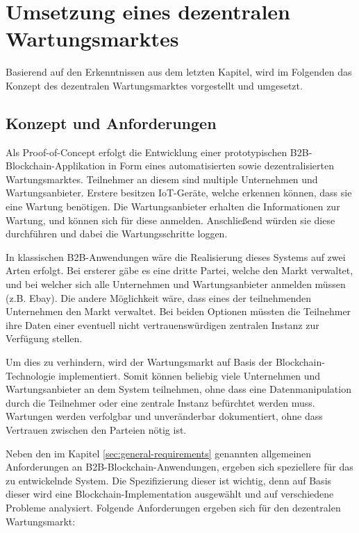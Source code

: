\chapter{Umsetzung eines dezentralen Wartungsmarktes}
\label{cha:wartungsmarkt-impl}

Basierend auf den Erkenntnissen aus dem letzten Kapitel, wird im Folgenden das Konzept des dezentralen Wartungsmarktes vorgestellt und umgesetzt.

\section{Konzept und Anforderungen}
Als Proof-of-Concept erfolgt die Entwicklung einer prototypischen B2B-Blockchain-Applikation in Form eines automatisierten sowie dezentralisierten Wartungsmarktes. Teilnehmer an diesem sind multiple Unternehmen und Wartungsanbieter. Erstere besitzen IoT-Geräte, welche erkennen können, dass sie eine Wartung benötigen. Die Wartungsanbieter erhalten die Informationen zur Wartung, und können sich für diese anmelden. Anschließend würden sie diese durchführen und dabei die Wartungsschritte loggen.  

In klassischen B2B-Anwendungen wäre die Realisierung dieses Systems auf zwei Arten erfolgt. Bei ersterer gäbe es eine dritte Partei, welche den Markt verwaltet, und bei welcher sich alle Unternehmen und Wartungsanbieter anmelden müssen (z.B. Ebay). Die andere Möglichkeit wäre, dass eines der teilnehmenden Unternehmen den Markt verwaltet. Bei beiden Optionen müssten die Teilnehmer ihre Daten einer eventuell nicht vertrauenswürdigen zentralen Instanz zur Verfügung stellen.

Um dies zu verhindern, wird der Wartungsmarkt auf Basis der Blockchain-Technologie implementiert. Somit können beliebig viele Unternehmen und Wartungsanbieter an dem System teilnehmen, ohne dass eine Datenmanipulation durch die Teilnehmer oder eine zentrale Instanz befürchtet werden muss. Wartungen werden verfolgbar und unveränderbar dokumentiert, ohne dass Vertrauen zwischen den Parteien nötig ist.

Neben den im Kapitel \ref{sec:general-requirements} genannten allgemeinen Anforderungen an B2B-Blockchain-Anwendungen, ergeben sich speziellere für das zu entwickelnde System. Die Spezifizierung dieser ist wichtig, denn auf Basis dieser wird eine Blockchain-Implementation ausgewählt und auf verschiedene Probleme analysiert. Folgende Anforderungen ergeben sich für den dezentralen Wartungsmarkt:

